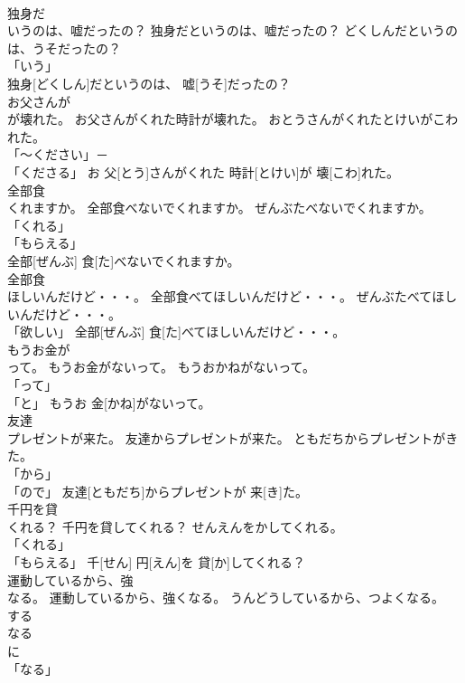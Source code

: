 \documentclass[8pt]{extreport}
\begin{document}
\begin{CJK}{UTF8}{min}
\\	独身だ
\\	いうのは、嘘だったの？	独身だというのは、嘘だったの？	どくしんだというのは、うそだったの？	
\\	「いう」 
\\	独身[どくしん]だというのは、 嘘[うそ]だったの？		
\\	お父さんが
\\	が壊れた。	お父さんがくれた時計が壊れた。	おとうさんがくれたとけいがこわれた。	
\\	「～ください」－ 
\\	「くださる」	お 父[とう]さんがくれた 時計[とけい]が 壊[こわ]れた。		
\\	全部食
\\	くれますか。	全部食べないでくれますか。	ぜんぶたべないでくれますか。	
\\	「くれる」 
\\	「もらえる」 
\\	全部[ぜんぶ] 食[た]べないでくれますか。		
\\	全部食
\\	ほしいんだけど・・・。	全部食べてほしいんだけど・・・。	ぜんぶたべてほしいんだけど・・・。	
\\	「欲しい」	全部[ぜんぶ] 食[た]べてほしいんだけど・・・。		
\\	もうお金が
\\	って。	もうお金がないって。	もうおかねがないって。	
\\	「って」 
\\	「と」	もうお 金[かね]がないって。		
\\	友達
\\	プレゼントが来た。	友達からプレゼントが来た。	ともだちからプレゼントがきた。	
\\	「から」 
\\	「ので」	友達[ともだち]からプレゼントが 来[き]た。		
\\	千円を貸
\\	くれる？	千円を貸してくれる？	せんえんをかしてくれる。	
\\	「くれる」 
\\	「もらえる」	千[せん] 円[えん]を 貸[か]してくれる？		
\\	運動しているから、強
\\	なる。	運動しているから、強くなる。	うんどうしているから、つよくなる。	
\\	する 
\\	なる 
\\	に 
\\	「なる」 

\end{CJK}
\end{document}
